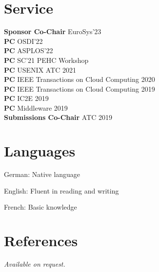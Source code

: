 \documentclass[margin,line]{cv/cv}
\begin{document}
\begin{resume}

    \section{\mysidestyle Service}
    \textbf{Sponsor Co-Chair} EuroSys'23\\%
    \textbf{PC} OSDI'22\\%
    \textbf{PC} ASPLOS'22\\%
    \textbf{PC} SC'21 PEHC Workshop \\%
    \textbf{PC} USENIX ATC 2021 \\%
    \textbf{PC} IEEE Transactions on Cloud Computing 2020 \\%
    \textbf{PC} IEEE Transactions on Cloud Computing 2019 \\%
    \textbf{PC} IC2E 2019 \\%
    \textbf{PC} Middleware 2019 \\%
    \textbf{Submissions Co-Chair} ATC 2019 \\%


    \section{\mysidestyle Languages}
    \begin{list2}
        \item German: Native language
        \item English: Fluent in reading and writing
        \item French: Basic knowledge
    \end{list2}\vspace{-1.5mm}


    \section{\mysidestyle References}
     {\sl Available on request.}


\end{resume}
\end{document}
